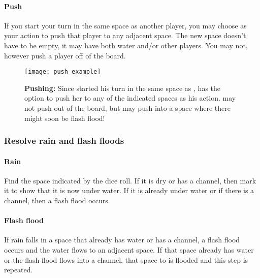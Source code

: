 \paragraph{Push}
If you start your turn in the same space as another player, you may choose as
your action to push that player to any adjacent space. The new space doesn't
have to be empty, it may have both water and/or other players. You may not,
however push a player off of the board.

\begin{SCfigure}
    \centering
    \caption{\textbf{Pushing:} Since \Xing{} started his turn in the same space
        as \Kim{}, \Xing{} has the option to push her to any of the indicated
        spaces as his action. \Xing{} may not push \Kim{} out of the board, but
        may push \Kim{} into a space where there might soon be flash flood!}
    \texttt{[image: push\_example]}
    \label{fig:push_example}
\end{SCfigure}


\subsubsection{Resolve rain and flash floods}
\paragraph{Rain}
Find the space indicated by the dice roll. If it is dry or has a channel, then
mark it to show that it is now under water. If it is already under water or if
there is a channel, then a flash flood occurs.

\paragraph{Flash flood}
\label{sec:flood}
If rain falls in a space that already has water or has a channel, a flash flood
occurs and the water flows to an adjacent space. If that space already has
water or the flash flood flows into a channel, that space to is flooded and
this step is repeated.

